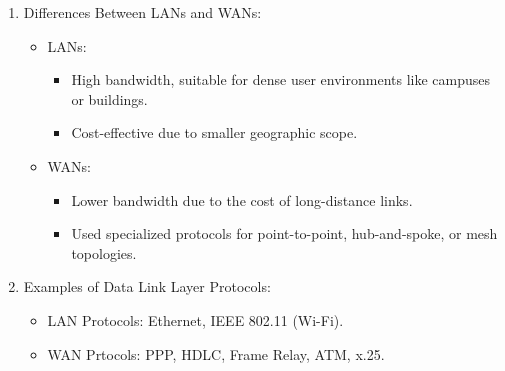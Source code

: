 \documentclass[a4paper,11pt]{article}
\begin{document}
\begin{enumerate}
\begin{itemize}
\begin{itemize}
            
        \end{itemize}
    \end{itemize}
    \newpage
    \item Differences Between LANs and WANs:\\
    \begin{itemize}
        \item LANs:\\
        \begin{itemize}
            \item High bandwidth, suitable for dense user environments like campuses or buildings.\\
            \item Cost-effective due to smaller geographic scope.\\
        \end{itemize}
        \item WANs:\\
        \begin{itemize}
            \item Lower bandwidth due to the cost of long-distance links.\\
            \item Used specialized protocols for point-to-point, hub-and-spoke, or mesh topologies.\\
        \end{itemize}
    \end{itemize}
    \item Examples of Data Link Layer Protocols:\\
    \begin{itemize}
        \item LAN Protocols: Ethernet, IEEE 802.11 (Wi-Fi).\\
        \item WAN Prtocols: PPP, HDLC, Frame Relay, ATM, x.25.\\
    \end{itemize}
\end{enumerate}

\newpage
\end{document}
